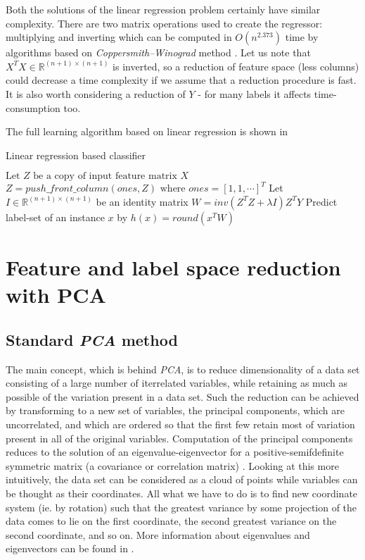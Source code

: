 Both the solutions of the linear regression problem certainly have similar complexity. There are two matrix operations used to create the regressor: multiplying and inverting which can be computed in $O(n^{2.373})$ time by algorithms based on \textit{Coppersmith–Winograd} method \cite{VVW}. Let us note that $X^TX \in \mathbb{R}^{(n+1) \times (n+1)}$ is inverted, so a reduction of feature space (less columns) could decrease a time complexity if we assume that a reduction procedure is fast. It is also worth considering a reduction of $Y$ - for many labels it affects time-consumption too. 

The full learning algorithm based on linear regression is shown in  

\begin{algorithm}
    \caption{Linear regression based classifier}\label{alg:LR}
    \begin{algorithmic}[1]
    \State $\text{Let } Z \text{ be a copy of input feature matrix } X$
    \State $Z=push\_front\_column(ones, Z) \text{ where } ones=[1, 1, \cdots]^T$
    \State Let $I \in \mathbb{R}^{(n+1) \times (n+1)}$ be an identity matrix
    \State $W=inv(Z^TZ+\lambda I)Z^TY$
    \State Predict label-set of an instance $x$ by $h(x)=round(x^TW)$ 
    \end{algorithmic}
\end{algorithm}


\section{Feature and label space reduction with PCA}

\subsection{Standard \textit{PCA} method}

The main concept, which is behind \textit{PCA}, is to reduce dimensionality of a data set consisting of a large number of iterrelated variables, while retaining as much as possible of the variation present in a data set. Such the reduction can be achieved by transforming to a new set of variables, the principal components, which are uncorrelated, and which are ordered so that the first few retain most of variation present in all of the original variables. Computation of the principal components reduces to the solution of an eigenvalue-eigenvector for a positive-semifdefinite symmetric matrix (a covariance or correlation matrix) \cite{Jolliffe}. Looking at this more intuitively, the data set can be considered as a cloud of points while variables can be thought as their coordinates. All what we have to do is to find new coordinate system (ie. by rotation) such that the greatest variance by some projection of the data comes to lie on the first coordinate, the second greatest variance on the second coordinate, and so on. More information about eigenvalues and eigenvectors can be found in . 

